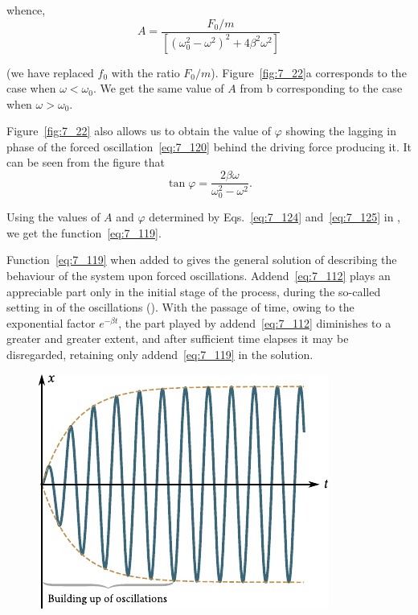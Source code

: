 \noindent
whence,
\begin{equation}\label{eq:7_124}
	A = \frac{F_0/m}{\left[\left(\omega_0^2 - \omega^2\right)^2 + 4\beta^2\omega^2\right]}
\end{equation}

\noindent
(we have replaced $f_0$ with the ratio $F_0/m$). Figure~\ref{fig:7_22}a corresponds to the case when $\omega<\omega_0$. We get the same value of $A$ from b corresponding to the case when $\omega>\omega_0$.

Figure~\ref{fig:7_22} also allows us to obtain the value of $\varphi$ showing the lagging in phase of the forced oscillation~\eqref{eq:7_120} behind the driving force producing it. It can be seen from the figure that
\begin{equation}\label{eq:7_125}
	\tan\varphi = \frac{2\beta\omega}{\omega_0^2 - \omega^2}.
\end{equation}

\noindent
Using the values of $A$ and $\varphi$ determined by Eqs.~\eqref{eq:7_124} and~\eqref{eq:7_125} in , we get the function~\eqref{eq:7_119}.

Function~\eqref{eq:7_119} when added to  gives the general solution of  describing the behaviour of the system upon forced oscillations. Addend~\eqref{eq:7_112} plays an appreciable part only in the initial stage of the process, during the so-called setting in of the oscillations (). With the passage of time, owing to the exponential factor $e^{-\beta t}$, the part played by addend~\eqref{eq:7_112} diminishes to a greater and greater extent, and after sufficient time elapses it may be disregarded, retaining only addend~\eqref{eq:7_119} in the solution.

\begin{figure}[t]
	\begin{center}
		\includegraphics[scale=0.95]{figures/ch_07/fig_7_23.pdf}
		\caption[]{}
		\label{fig:7_23}
	\end{center}
	\vspace{-0.8cm}
\end{figure}

